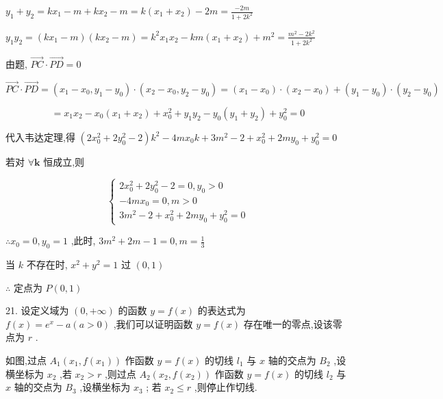 \documentclass[10pt]{article}
\begin{document}
\({y}_{1} + {y}_{2} = k{x}_{1} - m + k{x}_{2} - m = k\left( {{x}_{1} + {x}_{2}}\right)  - {2m} = \frac{-{2m}}{1 + 2{k}^{2}}\)

\({y}_{1}{y}_{2} = \left( {k{x}_{1} - m}\right) \left( {k{x}_{2} - m}\right)  = {k}^{2}{x}_{1}{x}_{2} - {km}\left( {{x}_{1} + {x}_{2}}\right)  + {m}^{2} = \frac{{m}^{2} - 2{k}^{2}}{1 + 2{k}^{2}}\)

由题, \(\overrightarrow{PC} \cdot  \overrightarrow{PD} = 0\)

\[
\overrightarrow{PC} \cdot  \overrightarrow{PD} = \left( {{x}_{1} - {x}_{0},{y}_{1} - {y}_{0}}\right)  \cdot  \left( {{x}_{2} - {x}_{0},{y}_{2} - {y}_{0}}\right)  = \left( {{x}_{1} - {x}_{0}}\right)  \cdot  \left( {{x}_{2} - {x}_{0}}\right)  + \left( {{y}_{1} - {y}_{0}}\right)  \cdot  \left( {{y}_{2} - {y}_{0}}\right)
\]

\[
= {x}_{1}{x}_{2} - {x}_{0}\left( {{x}_{1} + {x}_{2}}\right)  + {x}_{0}^{2} + {y}_{1}{y}_{2} - {y}_{0}\left( {{y}_{1} + {y}_{2}}\right)  + {y}_{0}^{2} = 0
\]

代入韦达定理,得 \(\left( {2{x}_{0}^{2} + 2{y}_{0}^{2} - 2}\right) {k}^{2} - {4m}{x}_{0}k + 3{m}^{2} - 2 + {x}_{0}^{2} + {2m}{y}_{0} + {y}_{0}^{2} = 0\)

若对 \(\forall \mathbf{k}\) 恒成立,则

\[
\left\{  \begin{array}{l} 2{x}_{0}^{2} + 2{y}_{0}^{2} - 2 = 0,{y}_{0} > 0 \\   - {4m}{x}_{0} = 0,m > 0 \\  3{m}^{2} - 2 + {x}_{0}^{2} + {2m}{y}_{0} + {y}_{0}^{2} = 0 \end{array}\right.
\]

\(\therefore {x}_{0} = 0,{y}_{0} = 1\) ,此时, \(3{m}^{2} + {2m} - 1 = 0,m = \frac{1}{3}\)

当 \(k\) 不存在时, \({x}^{2} + {y}^{2} = 1\) 过 \(\left( {0,1}\right)\)

\(\therefore\) 定点为 \(P\left( {0,1}\right)\)

21. 设定义域为 \(\left( {0, + \infty }\right)\) 的函数 \(y = f\left( x\right)\) 的表达式为 \(f\left( x\right)  = {e}^{x} - a\left( {a > 0}\right)\) ,我们可以证明函数 \(y = f\left( x\right)\) 存在唯一的零点,设该零点为 \(r\) .

如图,过点 \({A}_{1}\left( {{x}_{1},f\left( {x}_{1}\right) }\right)\) 作函数 \(y = f\left( x\right)\) 的切线 \({l}_{1}\) 与 \(x\) 轴的交点为 \({B}_{2}\) ,设横坐标为 \({x}_{2}\) ,若 \({x}_{2} > r\) ,则过点 \({A}_{2}\left( {{x}_{2},f\left( {x}_{2}\right) }\right)\) 作函数 \(y = f\left( x\right)\) 的切线 \({l}_{2}\) 与 \(x\) 轴的交点为 \({B}_{3}\) ,设横坐标为 \({x}_{3}\) ; 若 \({x}_{2} \leq  r\) ,则停止作切线.
\end{document}
